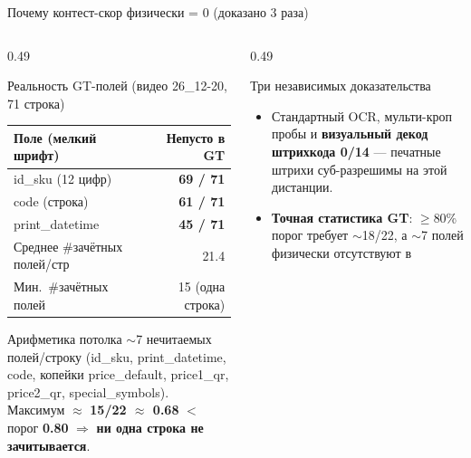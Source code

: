\documentclass[aspectratio=169,10pt]{beamer}
\newcommand{\code}[1]{{\ttfamily\small\color{slate}#1}}
\newcommand{\hl}[1]{{\bfseries\color{accent}#1}}
\newcommand{\hr}[1]{{\bfseries\color{redtag}#1}}
\begin{document}
\begin{frame}{Почему контест-скор физически = 0 (доказано 3 раза)}
  \begin{columns}[T,onlytextwidth]
    \begin{column}{0.49\textwidth}
      \begin{block}{Реальность GT-полей (видео 26\_12-20, 71 строка)}\footnotesize
        \setlength{\tabcolsep}{5pt}\renewcommand{\arraystretch}{1.12}
        \begin{tabular}{@{}lr@{}}\toprule
          \textbf{Поле (мелкий шрифт)} & \textbf{Непусто в GT}\\ \midrule
          \code{id\_sku} (12 цифр)     & \hr{69 / 71}\\
          \code{code} (строка)         & \hr{61 / 71}\\
          \code{print\_datetime}       & \hr{45 / 71}\\ \midrule
          Среднее \#зачётных полей/стр & 21.4\\
          Мин.\ \#зачётных полей       & 15 (одна строка)\\ \bottomrule
        \end{tabular}
      \end{block}
      \vspace{0.3em}
      \begin{block}{Арифметика потолка}\footnotesize
        $\sim$7 нечитаемых полей/строку (\code{id\_sku}, \code{print\_datetime},
        \code{code}, копейки \code{price\_default}, \code{price1\_qr},
        \code{price2\_qr}, \code{special\_symbols}).\\[0.2em]
        Максимум $\approx$ \hr{15/22 $\approx$ 0.68} $<$ порог \hl{0.80}
        $\Rightarrow$ \hr{ни одна строка не зачитывается}.
      \end{block}
    \end{column}
    \begin{column}{0.49\textwidth}
      \begin{block}{Три независимых доказательства}\footnotesize
        \begin{itemize}\setlength\itemsep{2pt}
          \item[\textbf{1.}] Стандартный OCR, мульти-кроп пробы и
            \hl{визуальный декод штрихкода 0/14} — печатные штрихи
            суб-разрешимы на этой дистанции.
          \item[\textbf{2.}] \hl{Точная статистика GT}: $\geq$80\% порог
            требует $\sim$18/22, а $\sim$7 полей физически отсутствуют в

\end{itemize}
\end{block}
\end{column}
\end{columns}
\end{frame}
\end{document}
